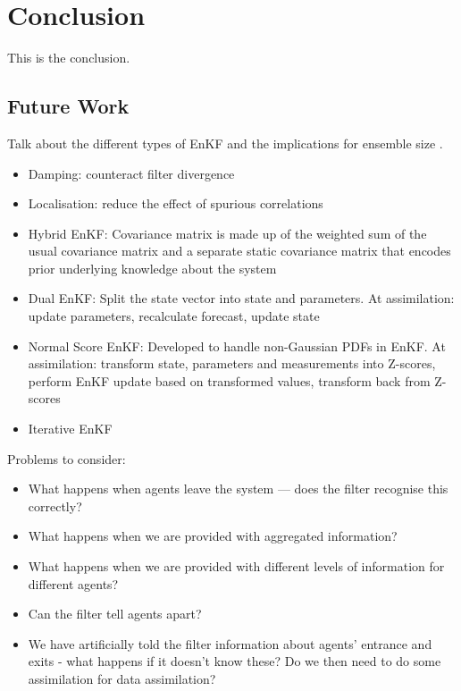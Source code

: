 \chapter{Conclusion}\label{ch:conclusion}

This is the conclusion.

\section{Future Work}\label{sec:conc:future}

Talk about the different types of EnKF and the implications for ensemble size
\citep{keller2018comparing}.
\begin{itemize}
    \item Damping: counteract filter divergence
    \item Localisation: reduce the effect of spurious correlations
    \item Hybrid EnKF: Covariance matrix is made up of the weighted sum of the
        usual covariance matrix and a separate static covariance matrix that
        encodes prior underlying knowledge about the system
    \item Dual EnKF: Split the state vector into state and parameters. At
        assimilation: update parameters, recalculate forecast, update state
    \item Normal Score EnKF: Developed to handle non-Gaussian PDFs in EnKF. At
        assimilation: transform state, parameters and measurements into
        Z-scores, perform EnKF update based on transformed values, transform
        back from Z-scores
    \item Iterative EnKF
\end{itemize}

Problems to consider:
\begin{itemize}
    \item What happens when agents leave the system --- does the filter
        recognise this correctly?
    \item What happens when we are provided with aggregated information?
    \item What happens when we are provided with different levels of information
        for different agents?
    \item Can the filter tell agents apart?
    \item We have artificially told the filter information about agents'
        entrance and exits - what happens if it doesn't know these? Do we then
        need to do some assimilation for data assimilation?
\end{itemize}

